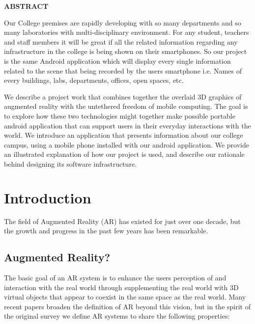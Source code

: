 \documentclass{article}
\begin{document}
\newpage
\linespread{1.6}
\setlength{\parskip}{.5cm}
\begin{center}
{\LARGE \textbf{ ABSTRACT}}\\[1cm]
\end{center}
\normalsize
	\par Our College premises are rapidly developing with so many departments and so many laboratories with multi-disciplinary environment. For any student, teachers and staff members it will be great if all the related information regarding any infrastructure in the college is being shown on their smartphones. So our project is the same Android application which will display every single information related to the scene that being recorded by the users smartphone i.e. Names of every buildings, labs, departments, offices, open spaces, etc. 
	\par We describe a project work that combines together the overlaid 3D graphics of augmented reality with the untethered freedom of mobile computing. The goal is to explore how these two technologies might together make possible portable android application that can support users in their everyday interactions with the world. We introduce an application that presents information about our college campus, using a mobile phone installed with our android application. We provide an illustrated explanation of how our project is used, and describe our rationale behind designing its software infrastructure.

\normalsize 


\linespread{1.3}
\newpage
\large
\section{Introduction}
\par The field of Augmented Reality (AR) has existed for just over one decade, but the growth and progress in the past few years has been remarkable. 
\subsection{Augmented Reality?}
\par The basic goal of an AR system is to enhance the users perception of and interaction with the real world through supplementing the real world with 3D virtual objects that appear to coexist in the same space as the real world.  Many recent papers broaden the definition of AR beyond this vision, but in the spirit of the original survey we define AR systems to share the following properties: 
\end{document}
